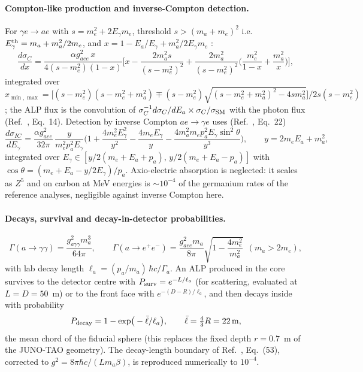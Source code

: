 \documentclass[aps,prd,superscriptaddress,nofootinbib,longbibliography,notitlepage,11pt]{revtex4-2}
\begin{document}
\paragraph{Compton-like production and inverse-Compton detection.}
For $\gamma e\to ae$ with $s=m_e^2+2E_\gamma m_e$, threshold $s>(m_a+m_e)^2$ i.e.\
$E_\gamma^{\rm th}=m_a+m_a^2/2m_e$, and $x=1-E_a/E_\gamma+m_a^2/2E_\gamma m_e$
\cite{Brodsky:1986mi,AristizabalSierra:2020rom}:
\begin{equation}
\frac{d\sigma_C}{dx}=\frac{\alpha g_{aee}^2\,x}{4(s-m_e^2)(1-x)}
\Big[x-\frac{2m_a^2s}{(s-m_e^2)^2}+\frac{2m_a^2}{(s-m_e^2)^2}
\Big(\frac{m_e^2}{1-x}+\frac{m_a^2}{x}\Big)\Big],
\label{eq:compton}
\end{equation}
integrated over $x_{\min,\max}=\big[(s-m_e^2)(s-m_e^2+m_a^2)\mp(s-m_e^2)
\sqrt{(s-m_e^2+m_a^2)^2-4sm_a^2}\big]/2s(s-m_e^2)$; the ALP flux is the convolution of
$\sigma_C^{-1}d\sigma_C/dE_a\times\sigma_C/\sigma_{\rm SM}$ with the photon flux
(Ref.~\cite{AristizabalSierra:2025myf}, Eq.~14).  Detection by inverse Compton
$ae\to\gamma e$ uses (Ref.~\cite{AristizabalSierra:2025myf}, Eq.~22)
\begin{equation}
\frac{d\sigma_{IC}}{dE_\gamma}=\frac{\alpha g_{aee}^2}{32\pi}\,\frac{y}{m_e^2p_a^2E_\gamma}
\Big(1+\frac{4m_e^2E_\gamma^2}{y^2}-\frac{4m_eE_\gamma}{y}
-\frac{4m_a^2m_ep_a^2E_\gamma\sin^2\theta}{y^3}\Big),\qquad y=2m_eE_a+m_a^2,
\label{eq:invcompton}
\end{equation}
integrated over $E_\gamma\in[y/2(m_e+E_a+p_a),\,y/2(m_e+E_a-p_a)]$ with
$\cos\theta=(m_e+E_a-y/2E_\gamma)/p_a$.  Axio-electric absorption is neglected: it scales
as $Z^5$ and on carbon at MeV energies is $\sim10^{-4}$ of the germanium rates of the
reference analyses, negligible against inverse Compton here.

\paragraph{Decays, survival and decay-in-detector probabilities.}
\begin{equation}
\Gamma(a\to\gamma\gamma)=\frac{g_{a\gamma\gamma}^2m_a^3}{64\pi},\qquad
\Gamma(a\to e^+e^-)=\frac{g_{aee}^2m_a}{8\pi}\sqrt{1-\frac{4m_e^2}{m_a^2}}\ \ (m_a>2m_e),
\label{eq:widths}
\end{equation}
with lab decay length $\ell_a=(p_a/m_a)\,\hbar c/\Gamma_a$.  An ALP produced in the core
survives to the detector centre with $P_{\rm surv}=e^{-L/\ell_a}$ (for scattering,
evaluated at $L=D=50$~m) or to the front face with $e^{-(D-R)/\ell_a}$, and then decays
inside with probability
\begin{equation}
P_{\rm decay}=1-\exp\!\big(-\bar\ell/\ell_a\big),\qquad \bar\ell=\tfrac43R=22\,\mathrm{m},
\label{eq:pdecay}
\end{equation}
the mean chord of the fiducial sphere (this replaces the fixed depth $r=0.7$~m of the
JUNO-TAO geometry).  The decay-length boundary of Ref.~\cite{AristizabalSierra:2025myf},
Eq.~(53), corrected to $g^2=8\pi\hbar c/(Lm_a\beta)$, is reproduced numerically to
$10^{-4}$.
\end{document}
